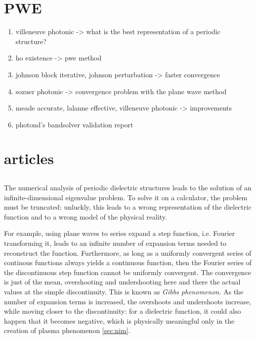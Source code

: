 \section{PWE} \label{sec:pwe}

\begin{enumerate}
\item
  villeneuve photonic -> what is the best representation of a periodic structure?
\item
  ho existence -> pwe method
\item
  johnson block iterative, johnson perturbation -> faster convergence
\item
  sozuer photonic -> convergence problem with the plane wave method
\item
  meade accurate, lalanne effective, villeneuve photonic -> improvements
\item
  photond's bandsolver validation report
\end{enumerate}

\section{articles}

\subsection{\cite{villeneuve_photonic}}

The numerical analysis of periodic dielectric structures leads to the
solution of an infinite-dimensional eigenvalue problem. To solve it on
a calculator, the problem must be truncated: unluckly, this leads to a
wrong representation of the dielectric function and to a wrong model
of the physical reality.


For example, using plane waves to series expand a step function,
i.e. Fourier transforming it, leads to an infinite number of expansion
terms needed to reconstruct the function. Furthermore, as long as a
uniformly convergent series of continous functions always yields a
continuous function, then the Fourier series of the discontinuous
step function cannot be uniformly convergent. The convergence is just
of the mean, overshooting and undershooting here and there the actual
values at the simple discontinuity. This is known as \emph{Gibbs
  phenomenon}. As the number of expansion terms is increased, the
overshoots and undershoots increase, while moving closer to the
discontinuity: for a dielectric function, it could also happen that it
becomes negative, which is physically meaningful only in the creation
of plasma phenomenon \ref{sec:nim}.

